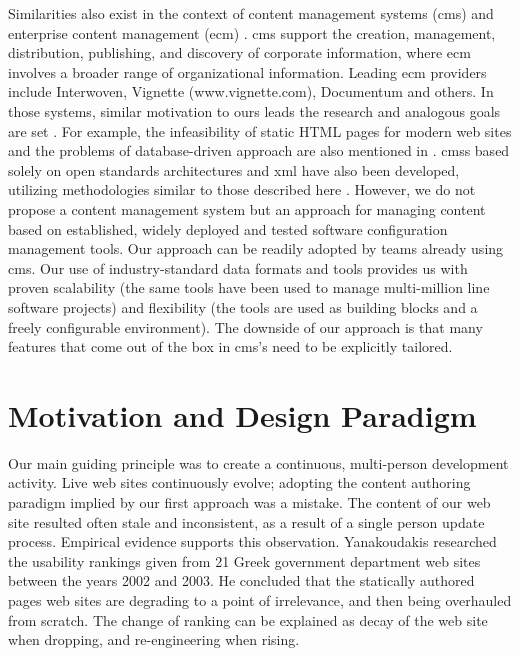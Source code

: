 \documentclass{elsart}
\begin{document}
Similarities also exist in the context of content management systems ({\sc cms}) \cite{SET02,MT04}
and enterprise content management ({\sc ecm}) \cite{NP04}.
{\sc cms} support the creation, management, distribution, publishing, and discovery of corporate information, where {\sc ecm} 
involves a broader range of organizational information. Leading {\sc ecm} providers include Interwoven, 
Vignette (www.vignette.com), Documentum and others. In those systems, similar motivation to ours 
leads the research and analogous goals are set \cite{KW05,DOC05}. For example, the infeasibility of static HTML pages for modern 
web sites and the problems of database-driven approach are also mentioned in \cite{KW05}. 
{\sc cms}s based solely on open standards architectures and
{\sc xml} have also been developed,
utilizing methodologies similar to those described here \cite{XYW02,OS05}.
However, we do not propose a content management system but an approach for managing content based on established, widely deployed 
and tested software configuration management tools. Our approach can be readily adopted by teams already using {\sc cms}. 
Our use of industry-standard data formats and tools provides us with proven scalability (the same tools have been used 
to manage multi-million line software projects) and flexibility (the tools are used as building blocks and a freely 
configurable environment). The downside of our approach is that many features that come out of the box in {\sc cms}'s need 
to be explicitly tailored.

\section{Motivation and Design Paradigm}
\label{sec:design}

Our main guiding principle was to create a continuous, multi-person 
development activity.
Live web sites continuously evolve;
adopting the content authoring paradigm implied
by our first approach was a mistake. The content of our web site resulted often stale and inconsistent, as a result 
of a single person update process.
Empirical evidence supports this observation.
Yanakoudakis \cite{G03} researched the usability rankings given from 21 Greek government department
web sites between the years 2002 and 2003. He concluded that 
the statically authored pages web sites are degrading to
a point of irrelevance, and then being overhauled from scratch.
The change of ranking can be explained as decay of the web site when dropping,
and re-engineering when rising.
\end{document}
